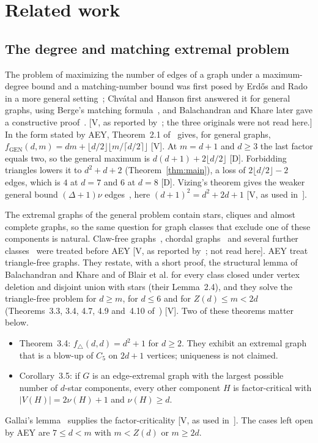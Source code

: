 \documentclass[11pt]{article}
\theoremstyle{remark}
\begin{document}
\section{Related work}\label{sec:related}

\subsection{The degree and matching extremal problem}

The problem of maximizing the number of edges of a graph under a maximum-degree bound and a matching-number bound was first posed by Erd\H{o}s and Rado in a more general setting~\cite{ER}; Chv\'atal and Hanson first answered it for general graphs, using Berge's matching formula~\cite{CH}, and Balachandran and Khare later gave a constructive proof~\cite{BK}. [V, as reported by~\cite{BET}; the three originals were not read here.] In the form stated by AEY, Theorem~2.1 of~\cite{AEY} gives, for general graphs, $f_{\mathrm{GEN}}(d,m)=dm+\lfloor d/2\rfloor\lfloor m/\lceil d/2\rceil\rfloor$ [V]. At $m=d+1$ and $d\ge3$ the last factor equals two, so the general maximum is $d(d+1)+2\lfloor d/2\rfloor$ [D]. Forbidding triangles lowers it to $d^2+d+2$ (Theorem~\ref{thm:main}), a loss of $2\lfloor d/2\rfloor-2$ edges, which is $4$ at $d=7$ and $6$ at $d=8$ [D]. Vizing's theorem gives the weaker general bound $(\Delta+1)\nu$ edges~\cite{Vizing}, here $(d+1)^2=d^2+2d+1$ [V, as used in~\cite{AEY}].

The extremal graphs of the general problem contain stars, cliques and almost complete graphs, so the same question for graph classes that exclude one of these components is natural. Claw-free graphs~\cite{Dibek}, chordal graphs~\cite{Blair} and several further classes~\cite{Maland} were treated before AEY [V, as reported by~\cite{AEY}; not read here]. AEY treat triangle-free graphs. They restate, with a short proof, the structural lemma of Balachandran and Khare and of Blair et al. for every class closed under vertex deletion and disjoint union with stars (their Lemma~2.4), and they solve the triangle-free problem for $d\ge m$, for $d\le6$ and for $Z(d)\le m<2d$ (Theorems~3.3, 3.4, 4.7, 4.9 and~4.10 of~\cite{AEY}) [V]. Two of these theorems matter below.
\begin{itemize}
\item Theorem~3.4: $f_\triangle(d,d)=d^2+1$ for $d\ge2$. They exhibit an extremal graph that is a blow-up of $C_5$ on $2d+1$ vertices; uniqueness is not claimed.
\item Corollary~3.5: if $G$ is an edge-extremal graph with the largest possible number of $d$-star components, every other component $H$ is factor-critical with $|V(H)|=2\nu(H)+1$ and $\nu(H)\ge d$.
\end{itemize}
Gallai's lemma~\cite{Gallai} supplies the factor-criticality [V, as used in~\cite{AEY}]. The cases left open by AEY are $7\le d<m$ with $m<Z(d)$ or $m\ge2d$.
\end{document}
